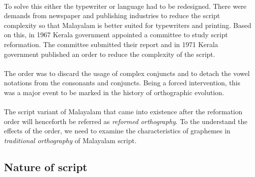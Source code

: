 \documentclass[10pt]{article}
\begin{document}
\paragraph{}
To solve this either the typewriter or language had to be redesigned. There were demands from newspaper and publishing industries to reduce the script complexity so that Malayalam is better suited for typewriters and printing. Based on this, in 1967 Kerala government appointed a committee to study script reformation. The committee submitted their report and in 1971 Kerala government published an order to reduce the complexity of the script\cite{1971go}.

\paragraph{}
The order was to discard the usage of complex conjuncts and to detach the vowel notations from the consonants and conjuncts. Being a forced intervention, this was a major event to be marked in the history of orthographic evolution. 

\paragraph{}
The script variant of Malayalam that came into existence after the reformation order will henceforth be referred as \textit{reformed orthography}. To the understand the effects of the order, we need to examine the characteristics of graphemes in \textit{traditional orthography} of Malayalam script.

\subsection{Nature of script}
\end{document}
